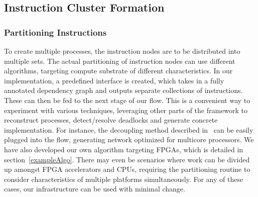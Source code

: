 \documentclass{sig-alternate}
\begin{document}
\subsection{Instruction Cluster Formation}
\subsubsection{Partitioning Instructions}
To create multiple processes, the instruction nodes are to be distributed into multiple sets. The actual partitioning of instruction nodes can use different algorithms, targeting compute substrate of different characteristics. In our implementation, a predefined interface is created, which takes in a fully annotated dependency graph and outputs separate collections of instructions. These can then be fed to the next stage of our flow. This is 
a convenient way to experiment with various techniques, leveraging other parts of the framework to reconstruct processes, detect/resolve deadlocks and generate concrete implementation. For instance, the decoupling method described in~\cite{dswp} can be easily plugged into the flow, generating network optimized for multicore processors. We have also developed our own algorithm targeting FPGAs, which is detailed in section~\ref{exampleAlgo}. 
There may even be scenarios where work can be divided up amongst FPGA accelerators and CPUs, requiring the partitioning routine to consider characteristics of multiple platforms simultaneously. For any of these cases, our infrastructure
can be used with minimal change.
\end{document}
